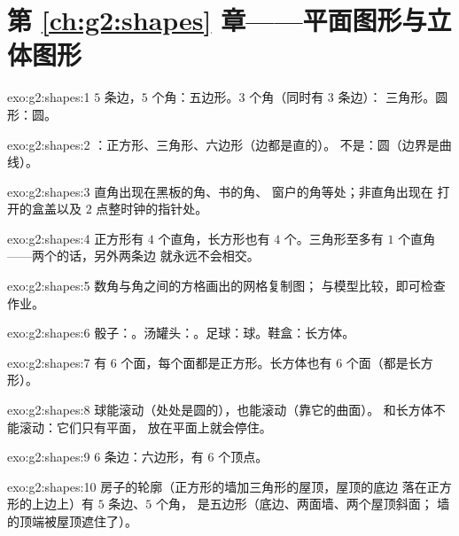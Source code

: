 \section*{第 \ref{ch:g2:shapes} 章——平面图形与立体图形}

\begin{solution}{exo:g2:shapes:1}
$5$ 条边，$5$ 个角：五边形。$3$ 个角（同时有 $3$ 条边）：
三角形。圆形：圆。
\end{solution}

\begin{solution}{exo:g2:shapes:2}
：正方形、三角形、六边形（边都是直的）。
不是：圆（边界是曲线）。
\end{solution}

\begin{solution}{exo:g2:shapes:3}
直角出现在黑板的角、书的角、
窗户的角等处；非直角出现在
打开的盒盖以及 $2$ 点整时钟的指针处。
\end{solution}

\begin{solution}{exo:g2:shapes:4}
正方形有 $4$ 个直角，长方形也有 $4$ 个。三角形至多有
$1$ 个直角——两个的话，另外两条边
就永远不会相交。
\end{solution}

\begin{solution}{exo:g2:shapes:5}
数角与角之间的方格画出的网格复制图；
与模型比较，即可检查作业。
\end{solution}

\begin{solution}{exo:g2:shapes:6}
骰子：。汤罐头：。足球：球。鞋盒：长方体。
\end{solution}

\begin{solution}{exo:g2:shapes:7}
有 $6$ 个面，每个面都是正方形。长方体也有
$6$ 个面（都是长方形）。
\end{solution}

\begin{solution}{exo:g2:shapes:8}
球能滚动（处处是圆的），也能滚动（靠它的曲面）。
和长方体不能滚动：它们只有平面，
放在平面上就会停住。
\end{solution}

\begin{solution}{exo:g2:shapes:9}
$6$ 条边：六边形，有 $6$ 个顶点。
\end{solution}

\begin{solution}{exo:g2:shapes:10}
房子的轮廓（正方形的墙加三角形的屋顶，屋顶的底边
落在正方形的上边上）有 $5$ 条边、$5$ 个角，
是五边形（底边、两面墙、两个屋顶斜面；
墙的顶端被屋顶遮住了）。
\end{solution}
